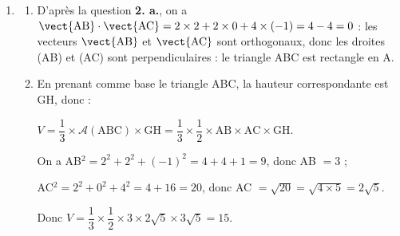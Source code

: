 \begin{enumerate}
\begin{enumerate}
Ces trois équations ont pour solution $t = 2$, donc G$(7~;~-4~;~4) \in \Delta$.
		\item 
Le point H appartient à la droite $\Delta$ et au plan (ABC). Donc ses coordonnées $x,\,y,\:z$ vérifient le système :

$\left\{\begin{array}{l c l}
x &=& -1 + 4t\\
y &=& \phantom{-}6 - 5t \quad\text{avec}\: t \in \R\\
z &=& \phantom{-}8 - 2t\\
4x - 5y - 2z + 5 &=& 0
\end{array}\right.$

En replaçant $x,\:y,\: z$ par leurs valeurs en fonction de $t$ dans la dernière équation, on obtient :

$4(- 1 + 4t) - 5(6 - 5t) - 2(8 - 2t) + 5 = 0\iff -4 + 16t - 30 + 25t - 16 + 4t + 5 = 0\iff 45t -45 = 0 \iff 45t = 45 \iff t = 1$.

Les coordonnées de H sont donc $(-1 + 4~;~6 - 5~;~8 - 2)$ soit H(3~;~1~;~6).
		\item 
		
		La distance du point G au plan (ABC) est donc égale à GH.
		
		Or GH$^2 = (3 - 7)^2 + (1 + 4)^2 + (6 - 4)^2 = 16 + 25 + 4 = 45$, d'où \\
		GH $= \sqrt{45} = \sqrt{9 \times 5} = \sqrt{9} \sqrt{5} = 3\sqrt{5}$.
	\end{enumerate}
\item
	\begin{enumerate}
		\item 
D'après la question \textbf{2. a.}, on a $\vect{\text{AB}} \cdot \vect{\text{AC}}  = 2 \times 2 + 2 \times 0 + 4 \times (- 1) = 4 - 4 = 0$ : les vecteurs $\vect{\text{AB}} $ et  $\vect{\text{AC}}$ sont orthogonaux, donc les droites (AB) et (AC) sont perpendiculaires : le triangle ABC est rectangle en A.

		\item 
En prenant comme base le triangle ABC, la hauteur correspondante est GH, donc :

$V = \dfrac13 \times \mathcal{A}(\text{ABC}) \times \text{GH} = \dfrac13 \times \dfrac12 \times \text{AB} \times \text{AC}  \times \text{GH}$.

On a AB$^2 = 2^2 + 2^2 + (- 1)^2 = 4 + 4 + 1 = 9$, donc AB $= 3$ ;

AC$^2 = 2^2 + 0^2 + 4^2 = 4 + 16 = 20$, donc AC $ = \sqrt{20} = \sqrt{4 \times 5} = 2\sqrt{5}$.

Donc $V = \dfrac13 \times \dfrac12 \times 3\times 2\sqrt{5}\times 3\sqrt{5} = 15$.
		

	\end{enumerate}
\end{enumerate}
